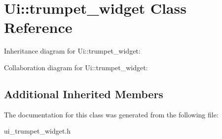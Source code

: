 \hypertarget{classUi_1_1trumpet__widget}{}\section{Ui\+:\+:trumpet\+\_\+widget Class Reference}
\label{classUi_1_1trumpet__widget}


Inheritance diagram for Ui\+:\+:trumpet\+\_\+widget\+:


Collaboration diagram for Ui\+:\+:trumpet\+\_\+widget\+:
\subsection*{Additional Inherited Members}


The documentation for this class was generated from the following file\+:\begin{DoxyCompactItemize}
\item 
ui\+\_\+trumpet\+\_\+widget.\+h\end{DoxyCompactItemize}
